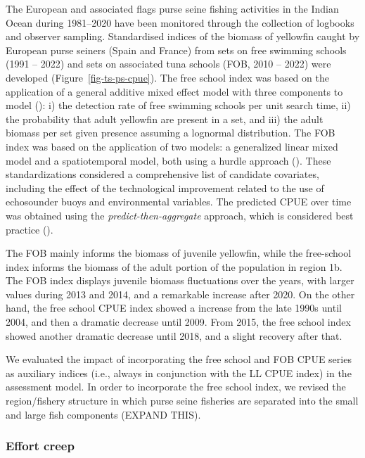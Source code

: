 \documentclass[
]{scrartcl}
\begin{document}
The European and associated flags purse seine fishing activities in the
Indian Ocean during 1981--2020 have been monitored through the
collection of logbooks and observer sampling. Standardised indices of
the biomass of yellowfin caught by European purse seiners (Spain and
France) from sets on free swimming schools (1991 -- 2022) and sets on
associated tuna schools (FOB, 2010 -- 2022) were developed
(Figure~\ref{fig-ts-ps-cpue}). The free school index was based on the
application of a general additive mixed effect model with three
components to model
(): i) the detection rate of free swimming schools per unit search
time, ii) the probability that adult yellowfin are present in a set, and
iii) the adult biomass per set given presence assuming a lognormal
distribution. The FOB index was based on the application of two models:
a generalized linear mixed model and a spatiotemporal model, both using
a hurdle approach (). These standardizations considered a comprehensive list of
candidate covariates, including the effect of the technological
improvement related to the use of echosounder buoys and environmental
variables. The predicted CPUE over time was obtained using the
\emph{predict-then-aggregate} approach, which is considered best
practice ().

The FOB mainly informs the biomass of juvenile yellowfin, while the
free-school index informs the biomass of the adult portion of the
population in region 1b. The FOB index displays juvenile biomass
fluctuations over the years, with larger values during 2013 and 2014,
and a remarkable increase after 2020. On the other hand, the free school
CPUE index showed a increase from the late 1990s until 2004, and then a
dramatic decrease until 2009. From 2015, the free school index showed
another dramatic decrease until 2018, and a slight recovery after that.

We evaluated the impact of incorporating the free school and FOB CPUE
series as auxiliary indices (i.e., always in conjunction with the LL
CPUE index) in the assessment model. In order to incorporate the free
school index, we revised the region/fishery structure in which purse
seine fisheries are separated into the small and large fish components
(EXPAND THIS).

\subsubsection{Effort creep}\label{effort-creep}
\end{document}
